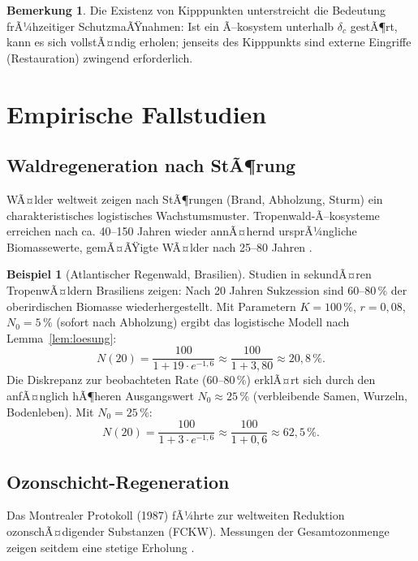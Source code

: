 ﻿\documentclass[a4paper,12pt]{article}
\theoremstyle{definition}
\newtheorem{beispiel}{Beispiel}
\newtheorem{bemerkung}{Bemerkung}
\begin{document}
\begin{bemerkung}
	Die Existenz von Kipppunkten unterstreicht die Bedeutung frÃ¼hzeitiger SchutzmaÃŸnahmen: Ist ein Ã–kosystem unterhalb $\delta_c$ gestÃ¶rt, kann es sich vollstÃ¤ndig erholen; jenseits des Kipppunkts sind externe Eingriffe (Restauration) zwingend erforderlich.
\end{bemerkung}

\section{Empirische Fallstudien}
\label{sec:fallstudien}

\subsection{Waldregeneration nach StÃ¶rung}

WÃ¤lder weltweit zeigen nach StÃ¶rungen (Brand, Abholzung, Sturm) ein charakteristisches logistisches Wachstumsmuster. Tropenwald-Ã–kosysteme erreichen nach ca. 40--150 Jahren wieder annÃ¤hernd ursprÃ¼ngliche Biomassewerte, gemÃ¤ÃŸigte WÃ¤lder nach 25--80 Jahren \cite{chazdon2016forest}.

\begin{beispiel}[Atlantischer Regenwald, Brasilien]
	Studien in sekundÃ¤ren TropenwÃ¤ldern Brasiliens zeigen: Nach 20 Jahren Sukzession sind 60--80\,\% der oberirdischen Biomasse wiederhergestellt. Mit Parametern $K = 100\,\%$, $r = 0{,}08$, $N_0 = 5\,\%$ (sofort nach Abholzung) ergibt das logistische Modell nach Lemma~\ref{lem:loesung}:
	\[
	N(20) = \frac{100}{1 + 19 \cdot e^{-1{,}6}} \approx \frac{100}{1 + 3{,}80} \approx 20{,}8\,\%.
	\]
	Die Diskrepanz zur beobachteten Rate (60--80\,\%) erklÃ¤rt sich durch den anfÃ¤nglich hÃ¶heren Ausgangswert $N_0 \approx 25\,\%$ (verbleibende Samen, Wurzeln, Bodenleben). Mit $N_0 = 25\,\%$:
	\[
	N(20) = \frac{100}{1 + 3 \cdot e^{-1{,}6}} \approx \frac{100}{1 + 0{,}6} \approx 62{,}5\,\%.
	\]
\end{beispiel}

\subsection{Ozonschicht-Regeneration}

Das Montrealer Protokoll (1987) fÃ¼hrte zur weltweiten Reduktion ozonschÃ¤digender Substanzen (FCKW). Messungen der Gesamtozonmenge zeigen seitdem eine stetige Erholung \cite{solomon2016emergence}.
\end{document}
